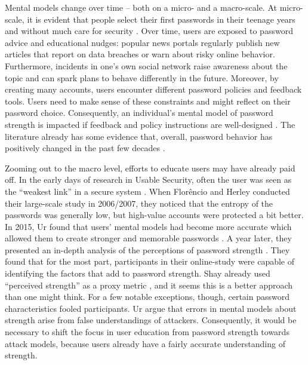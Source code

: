Mental models change over time -- both on a micro- and a macro-scale. At micro-scale, it is evident that people select their first passwords in their teenage years and without much care for security \cite{VonZezschwitz2013SurvivalShortest}. Over time, users are exposed to password advice and educational nudges: popular news portals regularly publish new articles that report on data breaches or warn about risky online behavior. Furthermore, incidents in one's own social network \cite{Stobert2014PasswordLifeCycle} raise awareness about the topic and can spark plans to behave differently in the future. Moreover, by creating many accounts, users encounter different password policies and feedback tools. Users need to make sense of these constraints and might reflect on their password choice. Consequently, an individual's mental model of password strength is impacted if feedback and policy instructions are well-designed \cite{Shay2015SpoonfulOfSugar, Ur2017DataDrivenPWMeter}. The literature already has some evidence that, overall, password behavior has positively changed in the past few decades \cite{Riley2006WhatUsersKnowWhatTheyDo, Schneier2006RealWorldPasswords}. 

Zooming out to the macro level, efforts to educate users may have already paid off. In the early days of research in Usable Security, often the user was seen as the ``weakest link'' in a secure system \cite{Adams1997MakingPWsSecureAndUsable, Sasse2005UsableSecurityPosition}. When Florêncio and Herley conducted their large-scale study in 2006/2007, they noticed that the entropy of the passwords was generally low, but high-value accounts were protected a bit better. In 2015, Ur \etal found that users' mental models had become more accurate which allowed them to create stronger and memorable passwords \cite{Ur2015PWCreationLab}. A year later, they presented an in-depth analysis of the perceptions of password strength \cite{Ur2016PerceptionsPassword}. They found that for the most part, participants in their online-study were capable of identifying the factors that add to password strength. Shay \etal already used ``perceived strength'' as a proxy metric \cite{Shay2015SpoonfulOfSugar}, and it seems this is a better approach than one might think. For a few notable exceptions, though, certain password characteristics fooled participants. Ur \etal argue that errors in mental models about strength arise from false understandings of attackers. Consequently, it would be necessary to shift the focus in user education from password strength towards attack models, because users already have a fairly accurate understanding of strength. 

